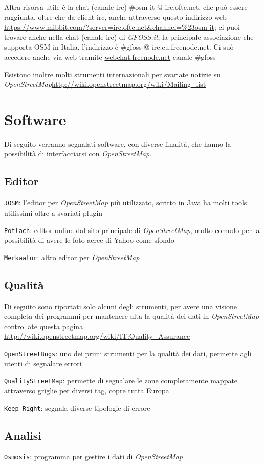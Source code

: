 \documentclass[a4paper,twoside,12pt,]{article}
\newcommand{\osm}{\emph{OpenStreetMap}\xspace}
\newcommand{\soft}[1]{\texttt{#1}}
\newcommand{\pro}[1]{\emph{#1}}
\begin{document}
Altra risorsa utile è la chat (canale irc) \#osm-it @ irc.oftc.net, che può essere raggiunta, oltre che da client irc, anche attraverso questo indirizzo web \url{https://www.mibbit.com/?server=irc.oftc.net\&channel=\%23osm-it}; ci puoi trovare anche nella chat (canale irc) di \pro{GFOSS.it}, la principale associazione che supporta OSM in Italia, l'indirizzo è \#gfoss @ irc.eu.freenode.net. Ci suò accedere anche via web tramite \url{webchat.freenode.net}  canale \#gfoss

Esistono inoltre molti strumenti internazionali per svariate notizie su \osm \url{http://wiki.openstreetmap.org/wiki/Mailing_list}

\section{Software}
Di seguito verranno segnalati software, con diverse finalità, che hanno la possibilità di interfacciarsi con \osm.

\subsection{Editor}
\soft{JOSM}: l'editor per \osm più utilizzato, scritto in Java ha molti tools utilissimi oltre a svariati plugin

\soft{Potlach}: editor online dal sito principale di \osm, molto comodo per la possibilità di avere le foto aeree di Yahoo come sfondo

\soft{Merkaator}: altro editor per \osm

\subsection{Qualità}
Di seguito sono riportati solo alcuni degli strumenti, per avere una visione completa dei programmi per mantenere alta la qualità dei dati in \osm controllate questa pagina \url{http://wiki.openstreetmap.org/wiki/IT:Quality_Assurance}

\soft{OpenStreetBugs}: uno dei primi strumenti per la qualità dei dati, permette agli utenti di segnalare errori

\soft{QualityStreetMap}: permette di segnalare le zone completamente mappate attraverso griglie per diversi tag, copre tutta Europa

\soft{Keep Right}: segnala diverse tipologie di errore

\subsection{Analisi}
\soft{Osmosis}: programma per gestire i dati di \osm
\end{document}
